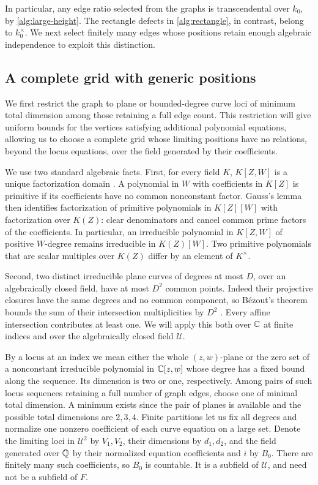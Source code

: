 In particular, any edge ratio selected from the graphs is transcendental
over \(k_0\), by \eqref{alg:large-height}. The rectangle defects in
\eqref{alg:rectangle}, in contrast, belong to \(k_0^\times\). We next
select finitely many edges whose positions retain enough algebraic
independence to exploit this distinction.

\subsection{A complete grid with generic positions}

We first restrict the graph to plane or bounded-degree curve loci of
minimum total dimension among those retaining a full edge count. This
restriction will give uniform bounds for the vertices satisfying additional
polynomial equations, allowing us to choose a complete grid whose limiting
positions have no relations, beyond the locus equations, over the field
generated by their coefficients.

We use two standard algebraic facts. First, for every field \(K\),
\(K[Z,W]\) is a unique factorization domain
\cite[Lemma~10.120.10]{stacksUFD}. A polynomial in \(W\) with
coefficients in \(K[Z]\) is primitive if its coefficients have no
common nonconstant factor. Gauss's lemma then identifies
factorization of primitive polynomials in \(K[Z][W]\) with
factorization over \(K(Z)\): clear denominators and cancel common
prime factors of the coefficients. In particular, an irreducible
polynomial in \(K[Z,W]\) of positive \(W\)-degree remains irreducible in
\(K(Z)[W]\). Two primitive polynomials that are scalar multiples
over \(K(Z)\) differ by an element of \(K^\times\).

Second, two distinct irreducible plane curves of degrees at most
\(D\), over an algebraically closed field, have at most \(D^2\)
common points. Indeed their projective closures have the same degrees
and no common component, so B\'ezout's theorem bounds the sum of their
intersection multiplicities by \(D^2\)
\cite[Section~5.3]{fultonCurves}. Every affine intersection contributes
at least one. We will apply this both over \(\mathbb C\) at finite indices
and over the algebraically closed field \(\mathcal U\).

By a locus at an index we mean either the whole \((z,w)\)-plane or the
zero set of a nonconstant irreducible polynomial in \(\mathbb C[z,w]\) whose
degree has a fixed bound along the sequence. Its dimension is two or
one, respectively. Among pairs of such locus sequences retaining a full
number of graph edges, choose one of minimal total dimension. A minimum
exists since the pair of planes is available and the possible total
dimensions are \(2,3,4\). Finite partitions let us fix all degrees and
normalize one nonzero coefficient of each curve equation on a large
set. Denote the limiting loci in \(\mathcal U^2\) by \(V_1,V_2\), their
dimensions by \(d_1,d_2\), and the field generated over \(\mathbb Q\) by their
normalized equation coefficients and \(i\) by \(B_0\). There are finitely
many such coefficients, so \(B_0\) is countable. It is a subfield of
\(\mathcal U\), and need not be a subfield of \(F\).

